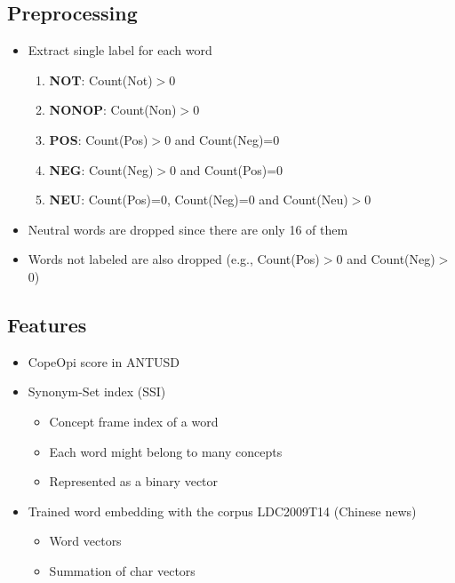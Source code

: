 \documentclass[compress]{beamer}
\begin{document}
    \subsection{Preprocessing}
        \begin{frame}{\subsecname}
            \begin{itemize}
                \item Extract single label for each word
                \begin{enumerate}
                    \item \textbf{NOT}: Count(Not)$>$0
                    \item \textbf{NONOP}: Count(Non)$>$0  
                    \item \textbf{POS}: Count(Pos)$>$0 and Count(Neg)=0  
                    \item \textbf{NEG}: Count(Neg)$>$0 and Count(Pos)=0  
                    \item \textbf{NEU}: Count(Pos)=0, Count(Neg)=0 and Count(Neu)$>$0  
                \end{enumerate}
                \item Neutral words are dropped since there are only 16 of them
                \item Words not labeled are also dropped (e.g., Count(Pos)$>$0 and Count(Neg)$>$0)
            \end{itemize}    
        \end{frame}
    \subsection{Features}
        \begin{frame}{\subsecname}
            \begin{itemize}
                \item CopeOpi score in ANTUSD
                \item Synonym-Set index (SSI)
                    \begin{itemize}
                        \item Concept frame index of a word
                        \item Each word might belong to many concepts
                        \item Represented as a binary vector %
                    \end{itemize}
                \item Trained word embedding with the corpus LDC2009T14 (Chinese news)
                    \begin{itemize}
                        \item Word vectors %
                        \item Summation of char vectors %
                    \end{itemize}
            \end{itemize}
        \end{frame}
\end{document}
